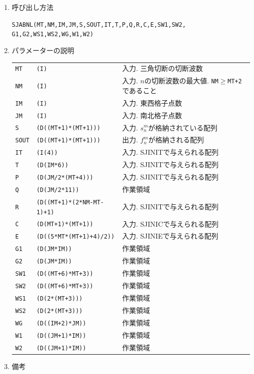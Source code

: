\documentclass[a4j]{jarticle}
\begin{document}
\begin{enumerate}
\item 呼び出し方法 

{\tt SJABNL(MT,NM,IM,JM,S,SOUT,IT,T,P,Q,R,C,E,SW1,SW2,%
G1,G2,WS1,WS2,WG,W1,W2)}

\item パラメーターの説明

\begin{tabular}{lll}
{\tt MT} & {\tt (I)} & 入力. 三角切断の切断波数\\
{\tt NM} & {\tt (I)} & 入力. $n$の切断波数の最大値. 
                        {\tt NM}$\ge${\tt MT+2}であること\\
{\tt IM} & {\tt (I)} & 入力. 東西格子点数\\
{\tt JM} & {\tt (I)} & 入力. 南北格子点数\\
{\tt S} & {\tt (D((MT+1)*(MT+1)))} 
& 入力. $s^m_n$が格納されている配列\\
{\tt SOUT} & {\tt (D((MT+1)*(MT+1)))} 
& 出力. $f^m_n$が格納される配列\\
{\tt IT} & {\tt (I(4))} & 入力. SJINITで与えられる配列\\
{\tt T} & {\tt (D(IM*6))} & 入力. SJINITで与えられる配列\\
{\tt P} & {\tt (D(JM/2*(MT+4)))} & 入力. SJINITで与えられる配列\\
{\tt Q} & {\tt (D(JM/2*11))} & 作業領域\\
{\tt R} & {\tt (D((MT+1)*(2*NM-MT-1)+1)} & 入力. SJINITで与えられる配列\\
{\tt C} & {\tt (D(MT+1)*(MT+1))} & 入力. SJINICで与えられる配列\\
{\tt E} & {\tt (D((5*MT*(MT+1)+4)/2))} & 入力. SJINIEで与えられる配列\\
{\tt G1} & {\tt (D(JM*IM))} & 作業領域\\
{\tt G2} & {\tt (D(JM*IM))} & 作業領域\\
{\tt SW1} & {\tt (D((MT+6)*MT+3))} & 作業領域\\
{\tt SW2} & {\tt (D((MT+6)*MT+3))} & 作業領域\\
{\tt WS1} & {\tt (D(2*(MT+3)))} & 作業領域\\
{\tt WS2} & {\tt (D(2*(MT+3)))} & 作業領域\\
{\tt WG} & {\tt (D((IM+2)*JM))} & 作業領域\\
{\tt W1} & {\tt (D((JM+1)*IM))} & 作業領域\\
{\tt W2} & {\tt (D((JM+1)*IM))} & 作業領域
\end{tabular}

\item 備考


\end{enumerate}
\end{document}
